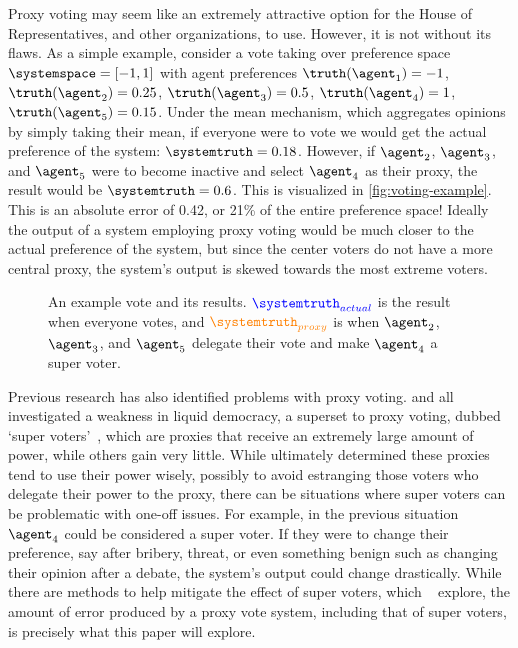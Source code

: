 Proxy voting may seem like an extremely attractive option for the House of
Representatives, and other organizations, to use.  
However, it is not without its flaws.
As a simple example, consider a vote taking over preference
space $\systemspace = [-1, 1]$ with agent preferences $\truthof{\agent_1} = -1$,
$\truthof{\agent_2} = 0.25$, $\truthof{\agent_3} = 0.5$, $\truthof{\agent_4} = 1$,
$\truthof{\agent_5} = 0.15$.
Under the mean mechanism, which aggregates opinions by simply taking their mean, if
everyone were to vote we would get the actual preference of the
system: $\systemtruth = 0.18$.
However, if $\agent_2$, $\agent_3$, and $\agent_5$ were to become inactive and select
$\agent_4$ as their proxy, the result would be $\systemtruth = 0.6$.
This is visualized in \autoref{fig:voting-example}.
This is an absolute error of 0.42, or 21\% of the entire preference space!
Ideally the output of a system employing proxy voting would be much closer to the
actual preference of the system, but since the center voters do not have a more
central proxy, the system's output is skewed towards the most extreme voters.

\begin{figure}[htbp]
    \centering
    
    \caption{
        An example vote and its results.
        $\textcolor{blue}{\systemtruth_{actual}}$ is the result when everyone votes,
        and $\textcolor{orange}{\systemtruth_{proxy}}$ is when $\agent_2$, $\agent_3$,
        and $\agent_5$ delegate their vote and make $\agent_4$ a super voter.
    }
    \label{fig:voting-example}
\end{figure}

Previous research has also identified problems with proxy voting.
 and  all investigated a weakness in liquid democracy, a
superset to proxy voting, dubbed `super voters'~\cite{Kling2015,Golz2021}, which are
proxies that receive an extremely large amount of power, while others gain very little.
While  ultimately determined these proxies tend to use their power
wisely, possibly to avoid estranging those voters who delegate their power to the
proxy, there can be situations where super voters can be problematic with one-off
issues.
For example, in the previous situation $\agent_4$ could be considered a super voter.
If they were to change their preference, say after bribery, threat, or even
something benign such as changing their opinion after a debate, the system's output
could change drastically.
While there are methods to help mitigate the effect of super voters, which
~\cite{Golz2021} explore, the amount of error produced by a proxy vote
system, including that of super voters, is precisely what this paper will explore.
